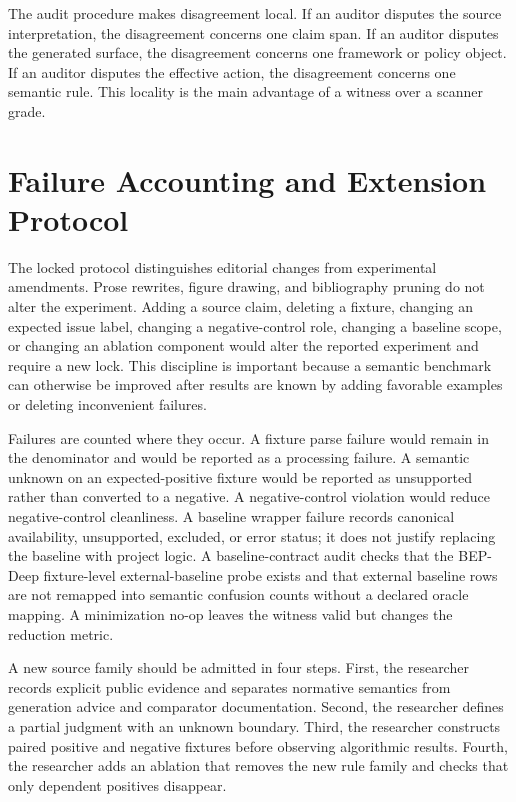 \documentclass[10pt,conference]{IEEEtran}
\begin{document}
The audit procedure makes disagreement local. If an auditor disputes the source interpretation, the disagreement concerns one claim span. If an auditor disputes the generated surface, the disagreement concerns one framework or policy object. If an auditor disputes the effective action, the disagreement concerns one semantic rule. This locality is the main advantage of a witness over a scanner grade.

\section{Failure Accounting and Extension Protocol}

The locked protocol distinguishes editorial changes from experimental amendments. Prose rewrites, figure drawing, and bibliography pruning do not alter the experiment. Adding a source claim, deleting a fixture, changing an expected issue label, changing a negative-control role, changing a baseline scope, or changing an ablation component would alter the reported experiment and require a new lock. This discipline is important because a semantic benchmark can otherwise be improved after results are known by adding favorable examples or deleting inconvenient failures.

Failures are counted where they occur. A fixture parse failure would remain in the denominator and would be reported as a processing failure. A semantic unknown on an expected-positive fixture would be reported as unsupported rather than converted to a negative. A negative-control violation would reduce negative-control cleanliness. A baseline wrapper failure records canonical availability, unsupported, excluded, or error status; it does not justify replacing the baseline with project logic. A baseline-contract audit checks that the BEP-Deep fixture-level external-baseline probe exists and that external baseline rows are not remapped into semantic confusion counts without a declared oracle mapping. A minimization no-op leaves the witness valid but changes the reduction metric.

A new source family should be admitted in four steps. First, the researcher records explicit public evidence and separates normative semantics from generation advice and comparator documentation. Second, the researcher defines a partial judgment with an unknown boundary. Third, the researcher constructs paired positive and negative fixtures before observing algorithmic results. Fourth, the researcher adds an ablation that removes the new rule family and checks that only dependent positives disappear.
\end{document}
